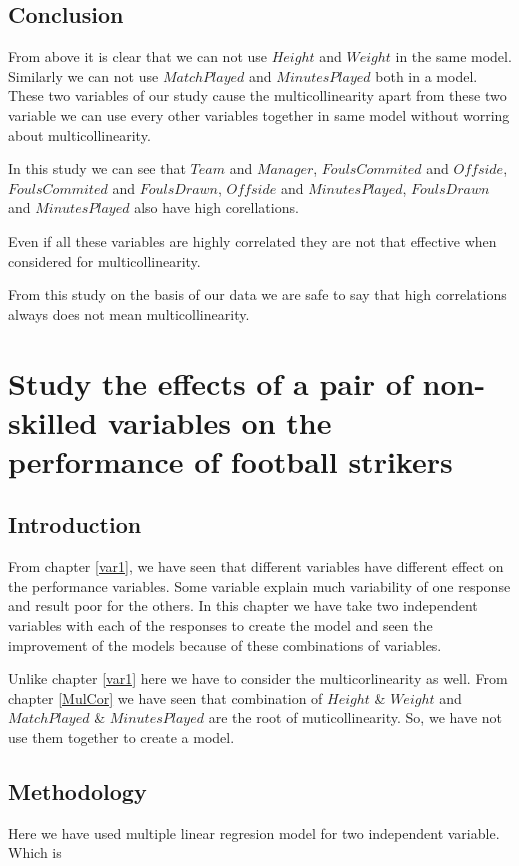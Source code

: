 \documentclass[12pt]{article}
\begin{document}
\subsection{Conclusion}
From above it is clear that we can not use $ Height $ and $ Weight $ in the same model. Similarly we can not use $ MatchPlayed $ and $ MinutesPlayed $ both in a model. These two variables of our study cause the multicollinearity apart from these two variable we can use every other variables together in same model without worring about multicollinearity. 

In this study we can see that $ Team $ and $ Manager $, $ FoulsCommited $ and $ Offside $, $ FoulsCommited $ and $ FoulsDrawn $, $ Offside $ and $ MinutesPlayed $, $ FoulsDrawn $ and $ MinutesPlayed $ also have high corellations.

Even if all these variables are highly correlated they are not that effective when considered for multicollinearity.

From this study on the basis of our data we are safe to say that high correlations always does not mean multicollinearity.

\newpage
\section{Study the effects of a pair of non-skilled variables on the performance of football strikers}
\label{var2}
\subsection{Introduction}
From chapter \ref{var1}, we have seen that different variables have different effect on the performance variables. Some variable explain much variability of one response and result poor for the others. In this chapter we have take two independent variables with each of the responses to create the model and seen the improvement of the models because of these combinations of variables. 

Unlike chapter \ref{var1} here we have to consider the multicorlinearity as well. From chapter \ref{MulCor} we have seen that combination of $ Height $ \& $ Weight $ and $ MatchPlayed $ \& $ MinutesPlayed $ are the root of muticollinearity. So, we have not use them together to create a model.
\subsection{Methodology}
Here we have used multiple linear regresion model for two independent variable. Which is
\end{document}
